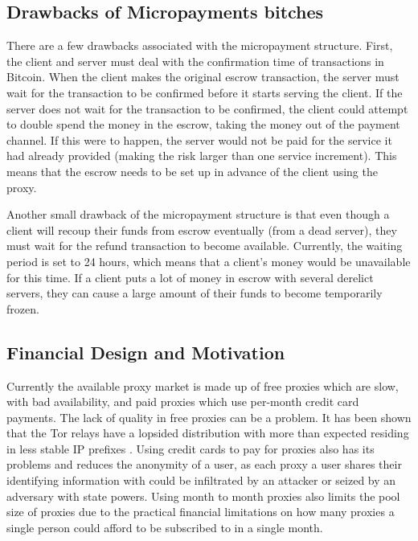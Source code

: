 \subsection{Drawbacks of Micropayments bitches}

There are a few drawbacks associated with the micropayment structure. First, 
the client and server must deal with the confirmation time of transactions in Bitcoin. When the client makes the original escrow transaction, the server must wait for the transaction to be confirmed before it starts serving the client. If the server does not wait for the transaction to be confirmed, the client could attempt to double spend the money in the escrow, taking the money out of the payment channel. If this were to happen, the server would not be paid for the service it had already provided (making the risk larger than one service increment). This means that the escrow needs to be set up in advance of the client using the proxy. 

Another small drawback of the micropayment structure is that even though a client will recoup their funds from escrow eventually (from a dead server), they must wait for the refund transaction to become available. Currently, the waiting period is set to 24 hours, which means that a client's money would be unavailable for this time. If a client puts a lot of money in escrow with several derelict servers, they can cause a large amount of their funds to become temporarily frozen.


\subsection{Financial Design and Motivation}

Currently the available proxy market is made up of free proxies which are slow, with bad availability, and paid proxies which use per-month credit card payments. The lack of quality in free proxies can be a problem. It has been shown that the Tor relays have a lopsided distribution with more than expected residing in less stable IP prefixes \cite{vanbever2014anonymity}. Using credit cards to pay for proxies also has its problems and reduces the anonymity of a user, as each proxy a user shares their identifying information with could be infiltrated by an attacker or seized by an adversary with state powers. Using month to month proxies also limits the pool size of proxies due to the practical financial limitations on how many proxies a single person could afford to be subscribed to in a single month. 

